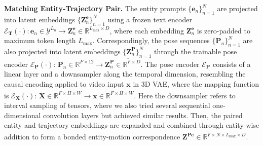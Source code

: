 \noindent \textbf{Matching Entity-Trajectory Pair.} The entity prompts $\{\mathbf{e}_n\}_{n=1}^N$ are projected into latent embeddings $\{\mathbf{Z}^{\mathbf{e}}_n\}_{n=1}^N$ using a frozen text encoder $\mathcal{E}_{\mathbf{T}}(\cdot): \mathbf{e}_n \in \mathcal{Y}^{L_n} \rightarrow \mathbf{Z}^{\mathbf{e}}_n \in \mathbb{R}^{L_{\text{max}}\times D}$, where each embedding $\mathbf{Z}^{\mathbf{e}}_n$ is zero-padded to maximum token length $L_{\text{max}}$. Correspondingly, the pose sequences $\{\mathbf{P}_n\}_{n=1}^N$ are also projected into latent embeddings $\{\mathbf{Z}^{\mathbf{P}}_n\}_{n=1}^N$ through the trainable pose encoder $\mathcal{E}_{\mathbf{P}}(\cdot)$: $\mathbf{P}_n \in \mathbb{R}^{F \times 12} \rightarrow \mathbf{Z}^{\mathbf{P}}_n \in \mathbb{R}^{\tilde{F} \times D}$. The pose encoder $\mathcal{E}_{\mathbf{P}}$ consists of a linear layer and a downsampler along the temporal dimension, resembling the causal encoding applied to video input $\mathbf{x}$ in 3D VAE, where the mapping function is $\mathcal{E}_{\mathbf{X}}(\cdot)$: $\mathbf{X} \in \mathbb{R}^{F \times H \times W} \rightarrow \mathbf{x}\in \mathbb{R}^{\tilde{F} \times \tilde{H} \times \tilde{W}}$. Here the downsampler refers to interval sampling of tensors, where we also tried several sequential one-dimensional convolution layers but achieved similar results. Then, the paired entity and trajectory embeddings are expanded and combined through entity-wise addition to form a bonded entity-motion correspondence $\mathbf{Z}^\mathbf{Pe}\in \mathbb{R}^{\tilde{F} \times N \times L_{\text{max}} \times D}$.


